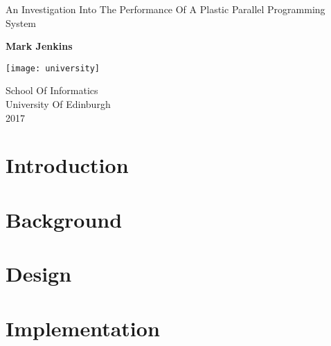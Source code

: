 \documentclass{report}
\begin{document}
\begin{titlepage}
    \begin{center}
        \vspace*{1cm}
        
        \Huge
        An Investigation Into The Performance Of A Plastic Parallel Programming System
        
        \vspace{1.5cm}
        
        \large
        \textbf{Mark Jenkins}
        
        \vspace{3.5cm}

        \texttt{[image: university]}

        \vspace{3.5cm}
        
        School Of Informatics\\
        University Of Edinburgh\\
        2017
        
    \end{center}
\end{titlepage}

\setlength\parskip{1em}
\setlength\parindent{0pt}



\tableofcontents

\newpage

\chapter{Introduction}
\label{chapter:introduction}


\chapter{Background}
\label{chapter:background}


\chapter{Design}
\label{chapter:design}


\chapter{Implementation}
\label{chapter:implementation}

\end{document}
